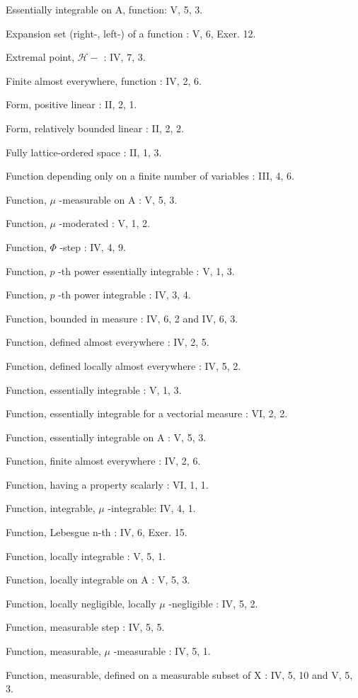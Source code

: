 Essentially integrable on A, function: V, 5, 3.

Expansion set (right-, left-) of a function : V, 6, Exer. 12.

Extremal point, \(\mathcal{H}-\) : IV, 7, 3.

Finite almost everywhere, function : IV, 2, 6.

Form, positive linear : II, 2, 1.

Form, relatively bounded linear : II, 2, 2.

Fully lattice-ordered space : II, 1, 3.

Function depending only on a finite number of variables : III, 4, 6.

Function, \(\mu\) -measurable on A : V, 5, 3.

Function, \(\mu\) -moderated : V, 1, 2.

Function, \(\Phi\) -step : IV, 4, 9.

Function, \(p\) -th power essentially integrable : V, 1, 3.

Function, \(p\) -th power integrable : IV, 3, 4.

Function, bounded in measure : IV, 6, 2 and IV, 6, 3.

Function, defined almost everywhere : IV, 2, 5.

Function, defined locally almost everywhere : IV, 5, 2.

Function, essentially integrable : V, 1, 3.

Function, essentially integrable for a vectorial measure : VI, 2, 2.

Function, essentially integrable on A : V, 5, 3.

Function, finite almost everywhere : IV, 2, 6.

Function, having a property scalarly : VI, 1, 1.

Function, integrable, \(\mu\) -integrable: IV, 4, 1.

Function, Lebesgue n-th : IV, 6, Exer. 15.

Function, locally integrable : V, 5, 1.

Function, locally integrable on A : V, 5, 3.

Function, locally negligible, locally \(\mu\) -negligible : IV, 5, 2.

Function, measurable step : IV, 5, 5.

Function, measurable, \(\mu\) -measurable : IV, 5, 1.

Function, measurable, defined on a measurable subset of X : IV, 5, 10 and V, 5, 3.

